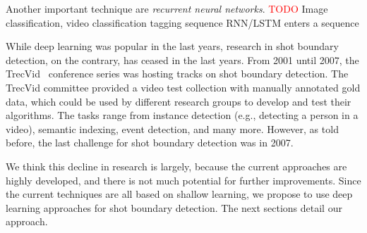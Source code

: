 Another important technique are \emph{recurrent neural networks}.
\textcolor{red}{TODO}
Image classification, video classification
tagging sequence
RNN/LSTM
enters a sequence

While deep learning was popular in the last years, research in shot boundary detection, on the contrary, has ceased in the last years.
From 2001 until 2007, the TrecVid~\cite{trecvid} conference series was hosting tracks on shot boundary detection.
The TrecVid committee provided a video test collection with manually annotated gold data, which could be used by different research groups to develop and test their algorithms.
The tasks range from instance detection (e.g., detecting a person in a video), semantic indexing, event detection, and many more.
However, as told before, the last challenge for shot boundary detection was in 2007.

We think this decline in research is largely, because the current approaches are highly developed, and there is not much potential for further improvements.
Since the current techniques are all based on shallow learning, we propose to use deep learning approaches for shot boundary detection.
The next sections detail our approach.

